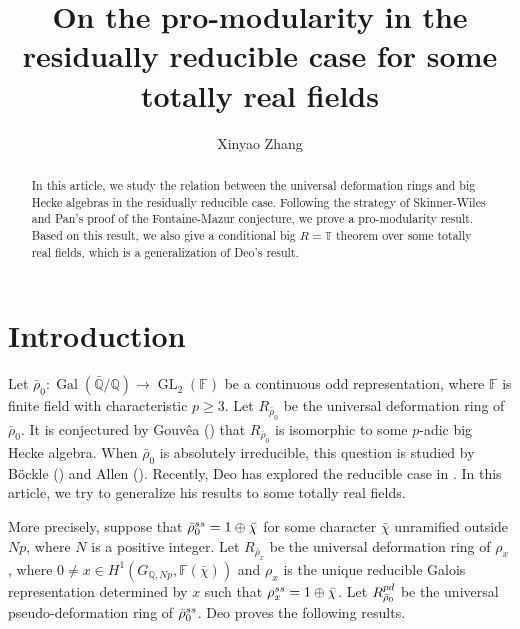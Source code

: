 \documentclass[12pt]{amsart}
\theoremstyle{plain}
\theoremstyle{definition}
\theoremstyle{remark}
\begin{document}
	
	
\title{On the pro-modularity in the residually reducible case for some totally real fields}
\author{Xinyao Zhang}
\maketitle

\begin{abstract}
	In this article, we study the relation between the universal deformation rings and big Hecke algebras in the residually reducible case. Following the strategy of Skinner-Wiles and Pan's proof of the Fontaine-Mazur conjecture, we prove a pro-modularity result. Based on this result, we also give a conditional big $R=\mathbb{T}$ theorem over some totally real fields, which is a generalization of Deo's result.
\end{abstract}



\section{Introduction}

Let $\bar{\rho}_0: \operatorname{Gal}(\bar{\mathbb{Q}}/\mathbb{Q}) \to \operatorname{GL}_2(\mathbb{F})$ be a continuous odd representation, where $\mathbb{F}$ is finite field with characteristic $p \ge 3$. Let $R_{\bar{\rho}_0}$ be the universal deformation ring of $\bar{\rho}_0$. It is conjectured by Gouv\^ea (\cite{gouvea2006arithmetic}) that $R_{\bar{\rho}_0}$ is isomorphic to some $p$-adic big Hecke algebra. When $\bar{\rho}_0$ is absolutely irreducible, this question is studied by B\"ockle (\cite{bockle2001density}) and Allen (\cite{allen2019automorphic}). Recently, Deo has explored the reducible case in \cite{deo2023density}. In this article, we try to generalize his results to some totally real fields.

More precisely, suppose that $\bar{\rho}_0^{\textnormal{ss}} =1 \oplus \bar{\chi}$ for some character $\bar{\chi}$ unramified outside $Np$, where $N$ is a positive integer. Let $R_{\bar{\rho}_x}$ be the universal deformation ring of $\rho_x$, where $0 \ne x \in H^1(G_{\mathbb{Q}, Np}, \mathbb{F}(\bar{\chi}))$ and $\rho_x$ is the unique reducible Galois representation determined by $x$ such that $\rho_x^{\textnormal{ss}}=1 \oplus \bar{\chi}$. Let $R_{\bar{\rho}_0}^{\textnormal{pd}}$ be the universal pseudo-deformation ring of $\bar{\rho}_0^{\textnormal{ss}}$. Deo proves the following results.
\end{document}
